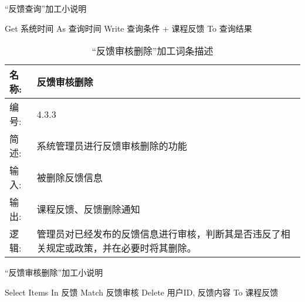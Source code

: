 \begin{algorithm}[H] 
    \renewcommand{\thealgorithm}{}
    \caption{“反馈查询”加工小说明} 
    \label{alg3} 
    \begin{algorithmic}[1]
        \STATE Get 系统时间 As 查询时间
        \STATE Write 查询条件 + 课程反馈 To 查询结果 
    \end{algorithmic} 
\end{algorithm}

\begin{table}[H]  
\caption{“反馈审核删除”加工词条描述}  
\begin{center}  
    \begin{tabular}{l p{11cm}} 
        \hline
        \quad 名称: & 反馈审核删除 \\
        \hline
        \quad 编号: & 4.3.3 \\
        \hline
        \quad 简述: & 系统管理员进行反馈审核删除的功能 \\
        \hline
        \quad 输入: & 被删除反馈信息 \\
        \hline
        \quad 输出: & 课程反馈、反馈删除通知 \\
        \hline
        \quad 逻辑: & 管理员对已经发布的反馈信息进行审核，判断其是否违反了相关规定或政策，并在必要时将其删除。 \\
        \hline
    \end{tabular}
    \label{tab1}
\end{center}
\end{table}


\begin{algorithm}[H]
    \renewcommand{\thealgorithm}{}
    \caption{“反馈审核删除”加工小说明} 
    \label{alg3} 
    \begin{algorithmic}[1]
        \STATE Select Items In 反馈 Match 反馈审核
        \STATE Delete 用户ID, 反馈内容 To 课程反馈
    \end{algorithmic} 
\end{algorithm}